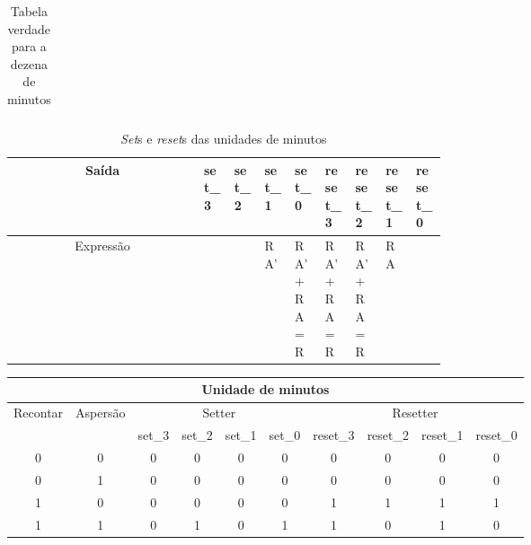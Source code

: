 \documentclass[
	article,			%
	11pt,				%
	oneside,			%
	a4paper,			%
	english,			%
	brazil,				%
	sumario=tradicional
	]{abntex2}
\begin{document}
\begin{itemize}
\begin{table}[H]
\begin{tabular}{| c  |c  |c  |c |c |c  |c  |c |c |c |}
\end{tabular}
\caption{Tabela verdade para a dezena de minutos}
\label{tab:Dezena de minutos}
\end{table}

\begin{table}[H]
    \centering
    \begin{tabular}{|c|>{\centering\arraybackslash}p{0.07\linewidth}|>{\centering\arraybackslash}p{0.07\linewidth}|>{\centering\arraybackslash}p{0.07\linewidth}|>{\centering\arraybackslash}p{0.07\linewidth}|>{\centering\arraybackslash}p{0.07\linewidth}|>{\centering\arraybackslash}p{0.07\linewidth}|>{\centering\arraybackslash}p{0.07\linewidth}|>{\centering\arraybackslash}p{0.07\linewidth}|} \hline 
          Saída&set_3&  set_2&  set_1&  set_0&  reset_3&  reset_2&  reset_1& reset_0\\ \hline 
          Expressão&0&  0&  RA'&  RA' + RA
 = 
R&  RA' + RA
=
R&  RA' + RA
=
R&  RA& 0\\ \hline
    \end{tabular}
    \caption{\textit{Set}s e \textit{reset}s das unidades de minutos}
    \label{tab:my_label}
\end{table}
 
\begin{table}[H]
\centering


\begin{tabular}{| c  |c  |c  |c |c |c  |c  |c |c |c |}
\hline
\multicolumn{10}{|c|}{Unidade de minutos} \\
\hline
Recontar& Aspersão& \multicolumn{4}{|c|}{Setter} & \multicolumn{4}{|c|}{Resetter} \\
\hline
 &  & set_3& set_2& set_1& set_0& reset_3& reset_2& reset_1& reset_0\\ \hline 
0 & 0 & 0 & 0 & 0 & 0 & 0 & 0 & 0 & 0 \\ \hline 
0 & 1 & 0 & 0 & 0 & 0 & 0 & 0 & 0 & 0 \\ \hline 
1 & 0 & 0 & 0 & 0 & 0 & 1 & 1 & 1 & 1 \\ \hline
1 & 1 & 0 & 1 & 0 & 1 & 1 & 0 & 1 & 0 \\ \hline


\end{tabular}
\end{table}
\end{itemize}
\end{document}
